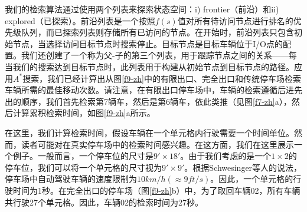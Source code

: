 我们的检索算法通过使用两个列表来探索状态空间：i) frontier（前沿）和ii) explored（已探索）。前沿列表是一个按照$f(s)$值对所有待访问节点进行排名的优先级队列，而已探索列表则存储所有已访问的节点。在开始时，前沿列表只包含初始节点，当选择访问目标节点时搜索停止。目标节点是目标车辆位于I/O点的配置。我们还创建了一个称为父-子的第三个列表，用于跟踪节点之间的关系——每当我们的搜索达到目标节点时，此列表用于构建从初始节点到目标节点的路径。应用$A^*$搜索，我们已经计算出从图\ref{f9-zh}中的有限出口、完全出口和传统停车场检索车辆所需的最佳移动次数。请注意，在有限出口停车场中，车辆的检索遵循后进先出的顺序，我们首先检索第7辆车，然后是第6辆车，依此类推（见图\ref{f7-zh}a），然后计算累积检索时间，如图\ref{f9-zh}a所示。


在这里，我们计算检索时间，假设车辆在一个单元格内行驶需要一个时间单位。然而，读者可能对在真实停车场中的检索时间感兴趣。在这方面，我们在这里展示一个例子。一般而言，一个停车位的尺寸是$9' \times 18'$。由于我们考虑的是一个$1 \times 2$的停车位，我们可以将一个单元格的尺寸视为$9' \times 9'$。根据Schwesinger等人的说法，停车场中自动驾驶车辆的速度限制为$10 km/h (≈ 9ft/s)$。因此，一个单元格的行驶时间为1秒。在完全出口的停车场（图\ref{f9-zh}b）中，为了取回车辆02，所有车辆共行驶27个单元格。因此，车辆02的检索时间为27秒。